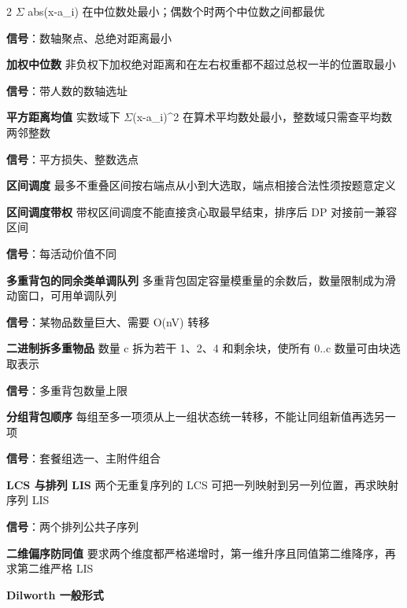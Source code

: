 \documentclass[UTF8,fontset=fandol,a4paper,twoside]{ctexart}
\begin{document}
\begin{multicols}{2}
\ensuremath{\Sigma} abs(\allowbreak{}x-\allowbreak{}a\_i)\allowbreak{} 在中位数处最小；偶数个时两个中位数之间都最优\par
\textbf{信号}：数轴聚点、总绝对距离最小\par
\par\textbf{加权中位数}\quad
非负权下加权绝对距离和在左右权重都不超过总权一半的位置取最小\par
\textbf{信号}：带人数的数轴选址\par
\par\textbf{平方距离均值}\quad
实数域下 \ensuremath{\Sigma}(\allowbreak{}x-\allowbreak{}a\_i)\allowbreak{}\textasciicircum{}2 在算术平均数处最小，整数域只需查平均数两邻整数\par
\textbf{信号}：平方损失、整数选点\par
\par\textbf{区间调度}\quad
最多不重叠区间按右端点从小到大选取，端点相接合法性须按题意定义\par
\par\textbf{区间调度带权}\quad
带权区间调度不能直接贪心取最早结束，排序后 DP 对接前一兼容区间\par
\textbf{信号}：每活动价值不同\par
\par\textbf{多重背包的同余类单调队列}\quad
多重背包固定容量模重量的余数后，数量限制成为滑动窗口，可用单调队列\par
\textbf{信号}：某物品数量巨大、需要 O(\allowbreak{}nV)\allowbreak{} 转移\par
\par\textbf{二进制拆多重物品}\quad
数量 c 拆为若干 1、2、4 和剩余块，使所有 0.\allowbreak{}.\allowbreak{}c 数量可由块选取表示\par
\textbf{信号}：多重背包数量上限\par
\par\textbf{分组背包顺序}\quad
每组至多一项须从上一组状态统一转移，不能让同组新值再选另一项\par
\textbf{信号}：套餐组选一、主附件组合\par
\par\textbf{LCS 与排列 LIS}\quad
两个无重复序列的 LCS 可把一列映射到另一列位置，再求映射序列 LIS\par
\textbf{信号}：两个排列公共子序列\par
\par\textbf{二维偏序防同值}\quad
要求两个维度都严格递增时，第一维升序且同值第二维降序，再求第二维严格 LIS\par
\par\textbf{Dilworth 一般形式}\quad

\end{multicols}
\end{document}
